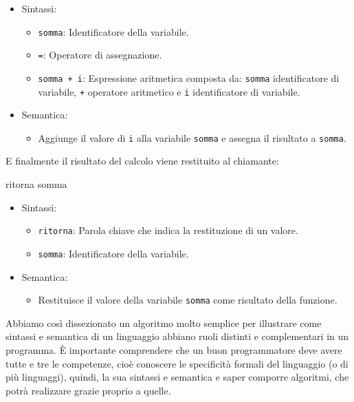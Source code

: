 \documentclass[
  letterpaper,
  DIV=11,
  numbers=noendperiod]{scrreprt}
\newenvironment{Shaded}{\begin{snugshade}}{\end{snugshade}}
\newcommand{\NormalTok}[1]{\textcolor[rgb]{0.00,0.23,0.31}{#1}}
\providecommand{\tightlist}{%
  \setlength{\itemsep}{0pt}\setlength{\parskip}{0pt}}\usepackage{longtable,booktabs,array}
\begin{document}
\begin{itemize}
\tightlist
\item
  Sintassi:

  \begin{itemize}
  \tightlist
  \item
    \texttt{somma}: Identificatore della variabile.
  \item
    \texttt{=}: Operatore di assegnazione.
  \item
    \texttt{somma\ +\ i}: Espressione aritmetica composta da:
    \texttt{somma} identificatore di variabile, \texttt{+} operatore
    aritmetico e \texttt{i} identificatore di variabile.
  \end{itemize}
\item
  Semantica:

  \begin{itemize}
  \tightlist
  \item
    Aggiunge il valore di \texttt{i} alla variabile \texttt{somma} e
    assegna il risultato a \texttt{somma}.
  \end{itemize}
\end{itemize}

E finalmente il risultato del calcolo viene restituito al chiamante:

\begin{Shaded}
\begin{Highlighting}[]
\NormalTok{ritorna somma}
\end{Highlighting}
\end{Shaded}

\begin{itemize}
\tightlist
\item
  Sintassi:

  \begin{itemize}
  \tightlist
  \item
    \texttt{ritorna}: Parola chiave che indica la restituzione di un
    valore.
  \item
    \texttt{somma}: Identificatore della variabile.
  \end{itemize}
\item
  Semantica:

  \begin{itemize}
  \tightlist
  \item
    Restituisce il valore della variabile \texttt{somma} come risultato
    della funzione.
  \end{itemize}
\end{itemize}

Abbiamo così dissezionato un algoritmo molto semplice per illustrare
come sintassi e semantica di un linguaggio abbiano ruoli distinti e
complementari in un programma. È importante comprendere che un buon
programmatore deve avere tutte e tre le competenze, cioè conoscere le
specificità formali del linguaggio (o di più linguaggi), quindi, la sua
sintassi e semantica e saper comporre algoritmi, che potrà realizzare
grazie proprio a quelle.
\end{document}
